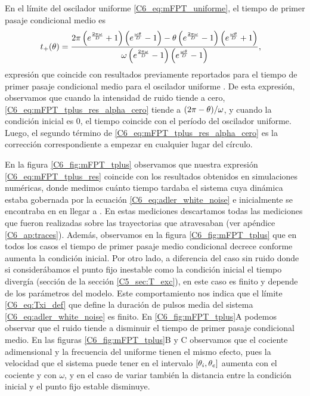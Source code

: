 \documentclass[./main.tex]{subfiles}
\begin{document}
En el límite del oscilador uniforme \ref{C6_eq:mFPT_uniforme}, el tiempo de primer pasaje condicional medio es 
\begin{align}
     t_{+}(\theta)& = \frac{2 \pi \left(e^{\frac{2 \pi \omega}{D}}+1\right) \left(e^{\frac{\omega \theta}{D}}-1\right)-\theta\left(e^{\frac{2 \pi\omega}{D}}-1\right) \left(e^{\frac{\omega \theta}{D}}+1\right)}{\omega \left(e^{\frac{2 \pi \omega}{D}}-1\right) \left(e^{\frac{\omega \theta}{D}}-1\right)},
     \label{C6_eq:mFPT_tplus_res_alpha_cero} 
\end{align}
expresión que coincide con resultados previamente reportados para el tiempo de primer pasaje condicional medio para el oscilador uniforme \cite{Redner2001}. De esta expresión, observamos que cuando la intensidad de ruido tiende a cero, \ref{C6_eq:mFPT_tplus_res_alpha_cero} tiende a $(2\pi - \theta)/\omega$, y cuando la condición inicial es $0$, el tiempo coincide con el período del oscilador uniforme. Luego, el segundo término de \ref{C6_eq:mFPT_tplus_res_alpha_cero} es la corrección correspondiente a empezar en cualquier lugar \xx del círculo. 

En la figura \ref{C6_fig:mFPT_tplus} observamos que nuestra expresión \ref{C6_eq:mFPT_tplus_res} coincide con los resultados obtenidos en simulaciones numéricas, donde medimos cuánto tiempo tardaba el sistema cuya dinámica estaba gobernada por la ecuación \ref{C6_eq:adler_white_noise} e inicialmente se encontraba en \xx en llegar a \xxe. En estas mediciones descartamos todas las mediciones que fueron realizadas sobre las trayectorias que atravesaban \xxi (ver apéndice \ref{C6_ap:traces}). Además, observamos en la figura \ref{C6_fig:mFPT_tplus} que en todos los casos el tiempo de primer pasaje medio condicional decrece conforme aumenta la condición inicial. Por otro lado, a diferencia del caso sin ruido donde si considerábamos el punto fijo inestable como la condición inicial el tiempo divergía (sección de la sección \ref{C5_sec:T_exc}), en este caso es finito y depende de los parámetros del modelo. Este comportamiento nos indica que el límite \ref{C6_eq:Txi_def} que define la duración de pulsos media del sistema \ref{C6_eq:adler_white_noise} es finito. En \ref{C6_fig:mFPT_tplus}A podemos observar que el ruido tiende a disminuir el tiempo de primer pasaje condicional medio. En las figuras \ref{C6_fig:mFPT_tplus}B y C observamos que el cociente adimensional \dddelta y la frecuencia del uniforme tienen el mismo efecto, pues la velocidad que el sistema puede tener en el intervalo $[\theta_i,\theta_e]$ aumenta con el cociente \dddelta y con $\omega$, y en el caso de variar \dddelta también la distancia entre la condición inicial \xx y el punto fijo estable disminuye. 
\end{document}
